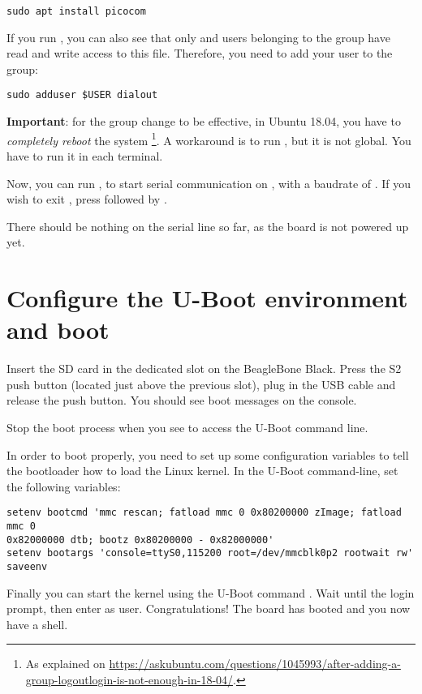 \begin{verbatim}
sudo apt install picocom
\end{verbatim}

If you run , you can also see that only
 and users belonging to the  group have
read and write access to this file. Therefore, you need to add your user
to the  group:

\begin{verbatim}
sudo adduser $USER dialout
\end{verbatim}

{\bf Important}: for the group change to be effective, in Ubuntu 18.04, you have to
{\em completely reboot} the system \footnote{As explained on
\url{https://askubuntu.com/questions/1045993/after-adding-a-group-logoutlogin-is-not-enough-in-18-04/}.}.
A workaround is to run , but it is not global.
You have to run it in each terminal.

Now, you can run , to start serial
communication on , with a baudrate of . If
you wish to exit , press \code{[Ctrl][a]} followed by
\code{[Ctrl][x]}.

There should be nothing on the serial line so far, as the board is not
powered up yet.

\section{Configure the U-Boot environment and boot}

Insert the SD card in the dedicated slot on the BeagleBone Black. Press the S2
push button (located just above the previous slot), plug in the USB cable and
release the push button. You should see boot messages on the console.

Stop the boot process when you see  to
access the U-Boot command line.

In order to boot properly, you need to set up some configuration variables to
tell the bootloader how to load the Linux kernel. In the U-Boot command-line,
set the following variables:
\begin{verbatim}
setenv bootcmd 'mmc rescan; fatload mmc 0 0x80200000 zImage; fatload mmc 0
0x82000000 dtb; bootz 0x80200000 - 0x82000000'
setenv bootargs 'console=ttyS0,115200 root=/dev/mmcblk0p2 rootwait rw'
saveenv
\end{verbatim}

Finally you can start the kernel using the U-Boot command . Wait
until the login prompt, then enter  as user. Congratulations! The
board has booted and you now have a shell.
